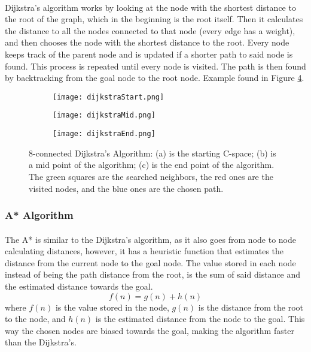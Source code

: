 \paragraph{}Dijkstra’s algorithm works by looking at the node with the shortest distance to the root of the graph, which
in the beginning is the root itself. Then it calculates the distance to all the nodes connected to that node (every edge
 has a weight), and then chooses the node with the shortest distance to the root. Every node keeps track of the 
parent node and is updated if a shorter path to said node is found. This process is repeated until
every node is visited. The path is then found by backtracking from the goal node to the root node. Example found in Figure \ref{fig:Dijkstra}. 
\begin{figure}[htbp]
    \centering
    \begin{subfigure}[b]{0.3\textwidth}
        \centering
        \texttt{[image: dijkstraStart.png]} %
        \caption{}
        \label{subfig:start}
    \end{subfigure}
    \hfill
    \begin{subfigure}[b]{0.3\textwidth}
        \centering
        \texttt{[image: dijkstraMid.png]} %
        \caption{}
        \label{subfig:mid}
    \end{subfigure}
    \hfill
    \begin{subfigure}[b]{0.3\textwidth}
        \centering
        \texttt{[image: dijkstraEnd.png]} %
        \caption{}
        \label{subfig:end}
    \end{subfigure}
    \caption{8-connected Dijkstra's Algorithm: (a) is the starting C-space; (b) is a mid point of the algorithm; (c) is the end point of the algorithm. The green squares are the searched neighbors, the red ones are the visited nodes, and the blue ones are the chosen path.}
    \label{fig:Dijkstra}
\end{figure}
\subsubsection{A* Algorithm}
\label{subsubsec:A*}
\paragraph{}The A* is similar to the Dijkstra's algorithm, as it also goes from node to node calculating distances, however, 
it has a heuristic function that estimates the distance from the current node to the goal node. The value stored in each node 
instead of being the path distance from the root, is the sum of said distance and the estimated distance towards the goal.
\begin{equation}
    f(n) = g(n) + h(n)
\end{equation}
where $f(n)$ is the value stored in the node, $g(n)$ is the distance from the root to the node, and $h(n)$ is the estimated 
distance from the node to the goal. This way the chosen nodes are biased towards the goal, making the algorithm faster than 
the Dijkstra's.

